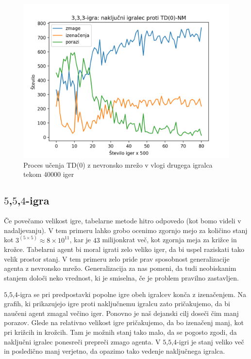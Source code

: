\documentclass[12pt,a4paper]{amsart}
\theoremstyle{definition} %
\theoremstyle{plain} %
\begin{document}
\begin{figure}[H]
    \includegraphics[scale=0.725]{../rezultati/tdnn-333-40000-2.png}
    \caption{Proces učenja TD($0$) z nevronsko mrežo v vlogi drugega igralca tekom 40000 iger}
\end{figure}

\subsection{$5$,$5$,$4$-igra}
Če povečamo velikost igre, tabelarne metode hitro odpovedo (kot bomo videli v nadaljevanju). V tem 
primeru lahko grobo ocenimo zgornjo mejo za količino stanj kot $3 ^ {(5 \times 5)} \approx 8 \times 
10^{11}$, kar je $43$ milijonkrat več, kot zgornja meja za križce in krožce. Tabelarni agent bi 
moral igrati zelo veliko iger, da bi uspel raziskati tako velik prostor stanj. V tem primeru zelo 
pride prav sposobnost generalizacije agenta z nevronsko mrežo. Generalizacija za nas pomeni, da tudi 
neobiskanim stanjem določi neko vrednost, ki je smiselna, če je problem pravilno zastavljen.

$5$,$5$,$4$-igra se pri predpostavki popolne igre obeh igralcev konča z izenačenjem. Na grafih, ki 
prikazujejo igre proti naključnemu igralcu zato pričakujemo, da bi naučeni agent zmagal večino iger. 
Ponovno je naš dejanski cilj doseči čim manj porazov. Glede na relativno velikost igre pričakujemo, 
da bo izenačenj manj, kot pri križcih in krožcih. Tam je možnih stanj tako malo, da se pogosto zgodi, 
da naključni igralec ponesreči prepreči zmago agenta. V $5$,$5$,$4$-igri je stanj veliko več in 
posledično manj verjetno, da opazimo tako vedenje naključnega igralca.
\end{document}
